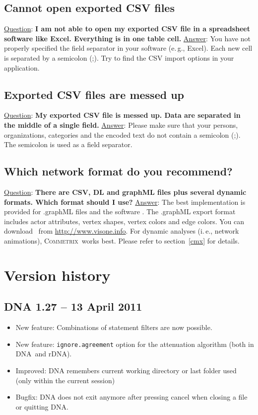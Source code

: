 \documentclass[12pt,a4paper]{scrreprt}
\newcommand{\visone}
{\textsf%
 {\protect\raisebox{.5ex}{\color[rgb]{0.1,0.1,0.1}v}%
  \protect\raisebox{.1ex}{\color[rgb]{0.3,0.3,0.3}i}%
  \protect\raisebox{-.1ex}{\color[rgb]{0.1,0.1,0.1}s}%
  \protect\raisebox{.1ex}{\color[rgb]{0.3,0.3,0.3}o}%
  \protect\raisebox{-.1ex}{\color[rgb]{0.1,0.1,0.1}n}%
  \protect\raisebox{-.4ex}{\color[rgb]{0.3,0.3,0.3}e}%
 }%
}
\newcommand{\dnashort}{\textsc{DNA}}
\newcommand{\commetrix}{\textsc{Commetrix}}
\newcommand{\code}[1]{\texttt{#1}}
\begin{document}
\section{Cannot open exported CSV files}
\underline{Question}: \textbf{I am not able to open my exported CSV file in a spreadsheet software like Excel. Everything is in one table cell.}
\vspace{0.3cm} \newline
\underline{Answer}: You have not properly specified the field separator in your software (e.\,g., Excel). Each new cell is separated by a semicolon (;). Try to find the CSV import options in your application.

\section{Exported CSV files are messed up}
\underline{Question}: \textbf{My exported CSV file is messed up. Data are separated in the middle of a single field.}
\vspace{0.3cm} \newline
\underline{Answer}: Please make sure that your persons, organizations, categories and the encoded text do not contain a semicolon (;). The semicolon is used as a field separator.

\section{Which network format do you recommend?}
\underline{Question}: \textbf{There are CSV, DL and graphML files plus several dynamic formats. Which format should I use?}
\vspace{0.3cm} \newline
\underline{Answer}: The best implementation is provided for .graphML files and the software \visone. The .graphML export format includes actor attributes, vertex shapes, vertex colors and edge colors. You can download \visone\ from \url{http://www.visone.info}. For dynamic analyses (i.\,e., network animations), \commetrix\ works best. Please refer to section~\ref{cmx} for details.


\chapter{Version history}

\section*{DNA 1.27 -- 13 April 2011}
\begin{itemize}
 \item New feature: Combinations of statement filters are now possible.
 \item New feature: \code{ignore.agreement} option for the attenuation algorithm (both in \dnashort\ and rDNA).
 \item Improved: DNA remembers current working directory or last folder used (only within the current session)
 \item Bugfix: DNA does not exit anymore after pressing cancel when closing a file or quitting \dnashort.
\end{itemize}
\end{document}
